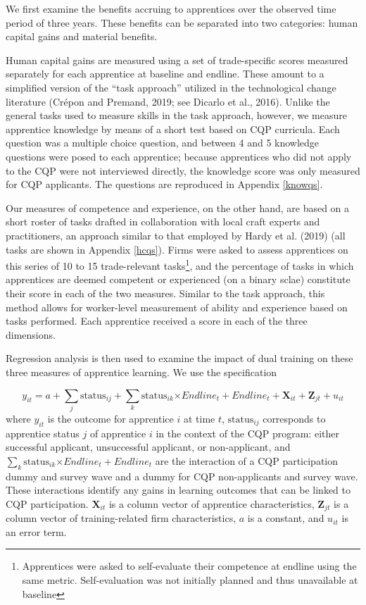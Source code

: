 \documentclass[
  11pt,
a4paper
]{article}
\begin{document}
We first examine the benefits accruing to apprentices over the observed time period of three years. These benefits can be separated into two categories: human capital gains and material benefits.

Human capital gains are measured using a set of trade-specific scores measured separately for each apprentice at baseline and endline. These amount to a simplified version of the ``task approach'' utilized in the technological change literature (Crépon and Premand, 2019; see Dicarlo et al., 2016). Unlike the general tasks used to measure skills in the task approach, however, we measure apprentice knowledge by means of a short test based on CQP curricula. Each question was a multiple choice question, and between 4 and 5 knowledge questions were posed to each apprentice; because apprentices who did not apply to the CQP were not interviewed directly, the knowledge score was only measured for CQP applicants. The questions are reproduced in Appendix \ref{knowqs}.

Our measures of competence and experience, on the other hand, are based on a short roster of tasks drafted in collaboration with local craft experts and practitioners, an approach similar to that employed by Hardy et al. (2019) (all tasks are shown in Appendix \ref{hcqs}). Firms were asked to assess apprentices on this series of 10 to 15 trade-relevant tasks\footnote{Apprentices were asked to self-evaluate their competence at endline using the same metric. Self-evaluation was not initially planned and thus unavailable at baseline}, and the percentage of tasks in which apprentices are deemed competent or experienced (on a binary sclae) constitute their score in each of the two measures. Similar to the task approach, this method allows for worker-level measurement of ability and experience based on tasks performed. Each apprentice received a score in each of the three dimensions.

Regression analysis is then used to examine the impact of dual training on these three measures of apprentice learning. We use the specification

\[ y_{it} = a+\sum_{j}\text{status}_{ij}+\sum_{k}\text{status}_{ik}\text{×}Endline_t+{Endline}_t+\mathbf{X}_{it}+\mathbf{Z}_{jt}+u_{it} \]
where \(y_{it}\) is the outcome for apprentice \(i\) at time \(t\), \(\text{status}_{ij}\) corresponds to apprentice status \(j\) of apprentice \(i\) in the context of the CQP program: either successful applicant, unsuccessful applicant, or non-applicant, and \(\sum_{k}\text{status}_{ik}\text{×}Endline_t+{Endline}_t\) are the interaction of a CQP participation dummy and survey wave and a dummy for CQP non-applicants and survey wave. These interactions identify any gains in learning outcomes that can be linked to CQP participation. \(\mathbf{X}_{it}\) is a column vector of apprentice characteristics, \(\mathbf{Z}_{jt}\) is a column vector of training-related firm characteristics, \(a\) is a constant, and \(u_{it}\) is an error term.
\end{document}
